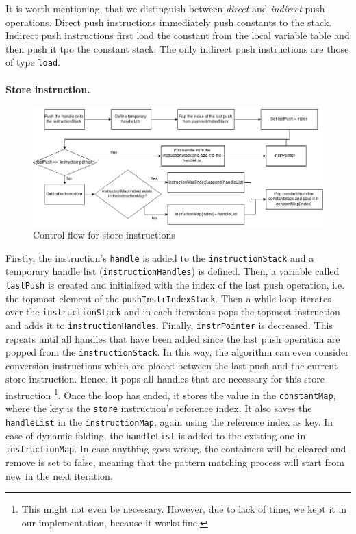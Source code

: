 It is worth mentioning, that we distinguish between \textit{direct} and \textit{indirect} push operations. Direct push instructions immediately push constants to the stack. Indirect push instructions first load the constant from the local variable table and then push it tpo the constant stack. The only indirect push instructions are those of type \texttt{load}.

\paragraph{Store instruction.}
\begin{figure}[h!]
\centering
\includegraphics[scale=0.5]{figures/store}
\caption{Control flow for store instructions}
\end{figure}

Firstly, the instruction’s \texttt{handle} is added to the \texttt{instructionStack} and a temporary handle list (\texttt{instructionHandles}) is defined. Then, a variable called \texttt{lastPush} is created and initialized with the index of the last push operation, i.e. the topmost element of the \texttt{pushInstrIndexStack}. Then a while loop iterates over the \texttt{instructionStack} and in each iterations pops the topmost instruction and adds it to \texttt{instructionHandles}. Finally, \texttt{instrPointer} is decreased. This repeats until all handles that have been added since the last push operation are popped from the \texttt{instructionStack}. 
In this way, the algorithm can even consider conversion instructions which are placed between the last push and the current store instruction. Hence, it pops all handles that are necessary for this store instruction \footnote{This might not even be necessary. However, due to lack of time, we kept it in our implementation, because it works fine.}. Once the loop has ended, it stores the value in the \texttt{constantMap}, where the key is the \texttt{store} instruction’s reference index. It also saves the \texttt{handleList} in the \texttt{instructionMap}, again using the reference index as key. In case of dynamic folding, the \texttt{handleList} is added to the existing one in \texttt{instructionMap}. In case anything goes wrong, the containers will be cleared and remove is set to false, meaning that the pattern matching process will start from new in the next iteration.

